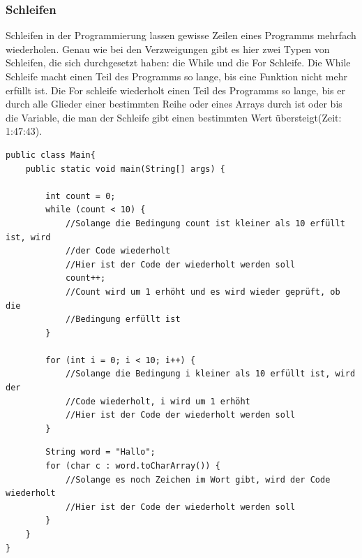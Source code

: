 \subsubsection{Schleifen}
Schleifen in der Programmierung lassen gewisse Zeilen eines Programms mehrfach wiederholen. Genau wie bei den Verzweigungen gibt es hier zwei Typen von Schleifen, die sich durchgesetzt haben: die While und die For Schleife. Die While Schleife macht einen Teil des Programms so lange, bis eine Funktion nicht mehr erfüllt ist. Die For schleife wiederholt einen Teil des Programms so lange, bis er durch alle Glieder einer bestimmten Reihe oder eines Arrays durch ist oder bis die Variable, die man der Schleife gibt einen bestimmten Wert übersteigt\cite{freecodecamporg_android_2020}(Zeit: 1:47:43).
\begin{verbatim}
public class Main{
    public static void main(String[] args) {
        
        int count = 0;
        while (count < 10) {
            //Solange die Bedingung count ist kleiner als 10 erfüllt ist, wird
            //der Code wiederholt
            //Hier ist der Code der wiederholt werden soll
            count++;
            //Count wird um 1 erhöht und es wird wieder geprüft, ob die 
            //Bedingung erfüllt ist
        }
        
        for (int i = 0; i < 10; i++) {
            //Solange die Bedingung i kleiner als 10 erfüllt ist, wird der 
            //Code wiederholt, i wird um 1 erhöht
            //Hier ist der Code der wiederholt werden soll
        }
\end{verbatim}
\newpage
\begin{verbatim}
        String word = "Hallo";
        for (char c : word.toCharArray()) {
            //Solange es noch Zeichen im Wort gibt, wird der Code wiederholt
            //Hier ist der Code der wiederholt werden soll
        }
    }
}
\end{verbatim}


